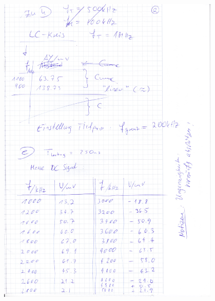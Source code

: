 \FloatBarrier
\begin{figure}
  \centering
  \includegraphics[width=0.95\textwidth]{messheft/seite_2.jpg}
  \caption{}
\label{fig:p2}
\end{figure}

